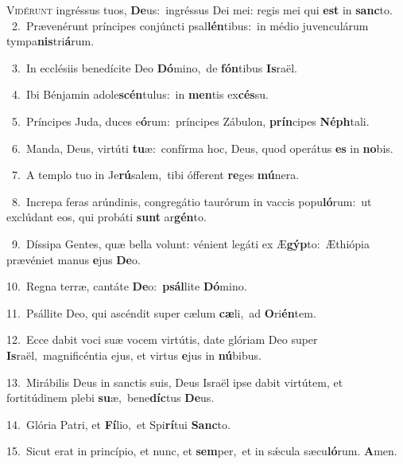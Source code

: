 \lettrine{\initial\textcolor{\initialcolor}{V}}{idérunt} ingréssus tuos, \textbf{De}\-us:~\star ingréssus Dei mei: regis mei qui \textbf{est} in \textbf{sanc}\-to.\\
{\numbfont\textcolor{\numbcolor}{~2.}}~Prævenérunt príncipes conjúncti psal\-\textbf{lén}\-tibus:~\star in médio juvenculárum tympa\-\textbf{nis}\-tri\-\textbf{á}\-rum.\par
{\numbfont\textcolor{\numbcolor}{~3.}}~In ecclésiis benedícite Deo \textbf{Dó}\-mino,~\star de \textbf{fón}\-tibus \textbf{Is}\-raël.\par
{\numbfont\textcolor{\numbcolor}{~4.}}~Ibi Bénjamin adole\-\textbf{scén}\-tulus:~\star in \textbf{men}\-tis ex\-\textbf{cés}\-su.\par
{\numbfont\textcolor{\numbcolor}{~5.}}~Príncipes Juda, duces e\-\textbf{ó}\-rum:~\star príncipes Zábulon, \textbf{prín}\-cipes \textbf{Néph}\-tali.\par
{\numbfont\textcolor{\numbcolor}{~6.}}~Manda, Deus, virtúti \textbf{tu}\-æ:~\star confírma hoc, Deus, quod operátus \textbf{es} in \textbf{no}\-bis.\par
{\numbfont\textcolor{\numbcolor}{~7.}}~A templo tuo in Je\-\textbf{rú}\-salem,~\star tibi ófferent \textbf{re}\-ges \textbf{mú}\-nera.\par
{\numbfont\textcolor{\numbcolor}{~8.}}~Increpa feras arúndinis, congregátio taurórum in vaccis popu\-\textbf{ló}\-rum:~\star ut exclúdant eos, qui probáti \textbf{sunt} ar\-\textbf{gén}\-to.\par
{\numbfont\textcolor{\numbcolor}{~9.}}~Díssipa Gentes, quæ bella volunt: vénient legáti ex Æ\-\textbf{gýp}\-to:~\star Æthiópia prævéniet manus \textbf{e}\-jus \textbf{De}\-o.\par
{\numbfont\textcolor{\numbcolor}{10.}}~Regna terræ, cantáte \textbf{De}\-o:~\star \textbf{psál}\-lite \textbf{Dó}\-mino.\par
{\numbfont\textcolor{\numbcolor}{11.}}~Psállite Deo, qui ascéndit super cælum \textbf{cæ}\-li,~\star ad \textbf{O}\-ri\-\textbf{én}\-tem.\par
{\numbfont\textcolor{\numbcolor}{12.}}~Ecce dabit voci suæ vocem virtútis, date glóriam Deo super \textbf{Is}\-raël,~\star magnificéntia ejus, et virtus \textbf{e}\-jus in \textbf{nú}\-bibus.\par
{\numbfont\textcolor{\numbcolor}{13.}}~Mirábilis Deus in sanctis suis, Deus Israël ipse dabit virtútem, et fortitúdinem plebi \textbf{su}\-æ,~\star bene\-\textbf{díc}\-tus \textbf{De}\-us.\par
{\numbfont\textcolor{\numbcolor}{14.}}~Glória Patri, et \textbf{Fí}\-lio,~\star et Spi\-\textbf{rí}\-tui \textbf{Sanc}\-to.\par
{\numbfont\textcolor{\numbcolor}{15.}}~Sicut erat in princípio, et nunc, et \textbf{sem}\-per,~\star et in sǽcula sæcu\-\textbf{ló}\-rum. \textbf{A}\-men.\par
